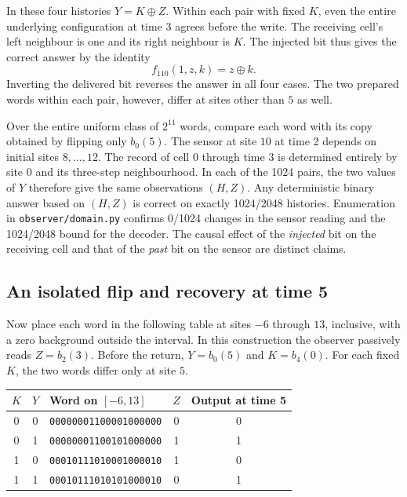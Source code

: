 In these four histories $Y=K\oplus Z$. Within each pair with fixed $K$, even the entire underlying configuration at time 3 agrees before the write. The receiving cell's left neighbour is one and its right neighbour is $K$. The injected bit thus gives the correct answer by the identity
\begin{equation}
 f_{110}(1,z,k)=z\oplus k.
 \label{eq:observer-xor-gate}
\end{equation}
Inverting the delivered bit reverses the answer in all four cases. The two prepared words within each pair, however, differ at sites other than $5$ as well.

Over the entire uniform class of $2^{11}$ words, compare each word with its copy obtained by flipping only $b_0(5)$. The sensor at site $10$ at time 2 depends on initial sites $8,\ldots,12$. The record of cell $0$ through time 3 is determined entirely by site $0$ and its three-step neighbourhood. In each of the 1024 pairs, the two values of $Y$ therefore give the same observations $(H,Z)$. Any deterministic binary answer based on $(H,Z)$ is correct on exactly 1024/2048 histories. Enumeration in \nolinkurl{observer/domain.py} confirms 0/1024 changes in the sensor reading and the 1024/2048 bound for the decoder. The causal effect of the \emph{injected} bit on the receiving cell and that of the \emph{past} bit on the sensor are distinct claims.

\subsection{An isolated flip and recovery at time 5}
\label{sec:observer-return}

Now place each word in the following table at sites $-6$ through $13$, inclusive, with a zero background outside the interval. In this construction the observer passively reads $Z=b_2(3)$. Before the return, $Y=b_0(5)$ and $K=b_4(0)$. For each fixed $K$, the two words differ only at site $5$.

\begin{center}
\begin{tabular}{cc l cc}
$K$ & $Y$ & Word on $[-6,13]$ & $Z$ & Output at time 5 \\
\hline
0 & 0 & \texttt{00000001100001000000} & 0 & 0 \\
0 & 1 & \texttt{00000001100101000000} & 1 & 1 \\
1 & 0 & \texttt{00010111010001000010} & 1 & 0 \\
1 & 1 & \texttt{00010111010101000010} & 0 & 1
\end{tabular}
\end{center}

